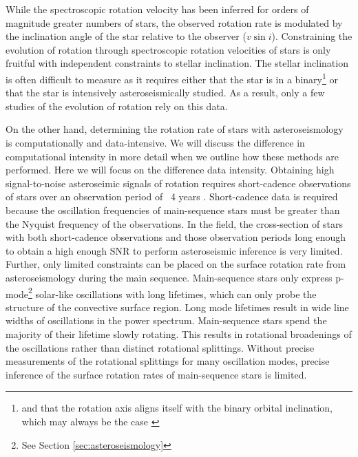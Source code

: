 While the spectroscopic rotation velocity has been inferred for orders of magnitude greater numbers of stars, the observed rotation rate is modulated by the inclination angle of the star relative to the observer ($v\sin{i}$).
Constraining the evolution of rotation through spectroscopic rotation velocities of stars is only fruitful with independent constraints to stellar inclination.
The stellar inclination is often difficult to measure as it requires either that the star is in a binary\footnote{and that the rotation axis aligns itself with the binary orbital inclination, which may always be the case \cite{albrecht_banana_2011,albrecht_banana_2013}} or that the star is intensively asteroseismically studied.
As a result, only a few studies of the evolution of rotation rely on this data.



On the other hand, determining the rotation rate of stars with asteroseismology is computationally and data-intensive.
We will discuss the difference in computational intensity in more detail when we outline how these methods are performed.
Here we will focus on the difference data intensity.
Obtaining high signal-to-noise asteroseimic signals of rotation requires short-cadence observations of stars over an observation period of ~4 years \citep{deheuvels_seismic_2014}. 
Short-cadence data is required because the oscillation frequencies of main-sequence stars must be greater than the Nyquist frequency of the observations.
In the \kepler{} field, the cross-section of stars with both short-cadence observations and those observation periods long enough to obtain a high enough SNR to perform asteroseismic inference is very limited.
Further, only limited constraints can be placed on the surface rotation rate from asteroseismology during the main sequence.
Main-sequence stars only express p-mode\footnote{See Section \ref{sec:asteroseismology}} solar-like oscillations with long lifetimes, which can only probe the structure of the convective surface region.
Long mode lifetimes result in wide line widths of oscillations in the power spectrum.
Main-sequence stars spend the majority of their lifetime slowly rotating.
This results in rotational broadenings of the oscillations rather than distinct rotational splittings.
Without precise measurements of the rotational splittings for many oscillation modes, precise inference of the surface rotation rates of main-sequence stars is limited.

